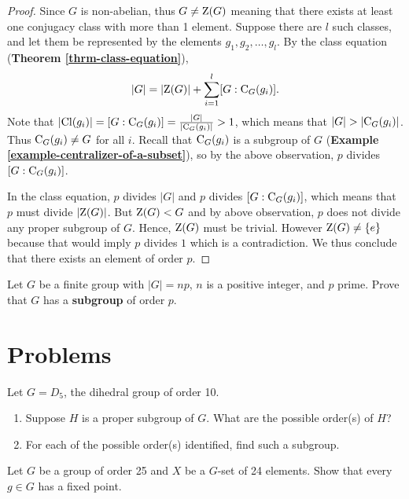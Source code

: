 \begin{proof}
    Since $G$ is non-abelian, thus $G \neq \mathrm{Z}(G)$ meaning that there exists at least one conjugacy class with more than 1 element. Suppose there are $l$ such classes, and let them be represented by the elements $g_1, g_2, \dots, g_l$. By the class equation (\textbf{Theorem \ref{thrm-class-equation}}),
    \[
        |G| = |\mathrm{Z}(G)| + \sum_{i=1}^l [G:\mathrm{C}_{G}(g_i)].
    \]
    Note that $|\mathrm{Cl}(g_i)| = [G:\mathrm{C}_{G}(g_i)] = \frac{|G|}{|\mathrm{C}_{G}(g_i)|} > 1$, which means that $|G| > |\mathrm{C}_{G}(g_i)|$. Thus $\mathrm{C}_{G}(g_i) \neq G$ for all $i$. Recall that $\mathrm{C}_{G}(g_i)$ is a subgroup of $G$ (\textbf{Example \ref{example-centralizer-of-a-subset}}), so by the above observation, $p$ divides $[G:\mathrm{C}_{G}(g_i)]$.

    In the class equation, $p$ divides $|G|$ and $p$ divides $[G:\mathrm{C}_{G}(g_i)]$, which means that $p$ must divide $|\mathrm{Z}(G)|$. But $\mathrm{Z}(G) < G$ and by above observation, $p$ does not divide any proper subgroup of $G$. Hence, $\mathrm{Z}(G)$ must be trivial. However $\mathrm{Z}(G) \neq \{e\}$ because that would imply $p$ divides $1$ which is a contradiction. We thus conclude that there exists an element of order $p$.
\end{proof}

\begin{exercise}\label{exercise-group-of-order-multiple-of-prime-has-subgroup-of-prime-order}
    Let $G$ be a finite group with $|G| = np$, $n$ is a positive integer, and $p$ prime. Prove that $G$ has a \textbf{subgroup} of order $p$.
\end{exercise}

\newpage

\section{Problems}
\begin{problem}
    Let $G = D_5$, the dihedral group of order 10.
    \begin{enumerate}[label=(\alph*)]
        \item Suppose $H$ is a proper subgroup of $G$. What are the possible order(s) of $H$?
        \item For each of the possible order(s) identified, find such a subgroup.
    \end{enumerate}
\end{problem}

\begin{problem}
    Let $G$ be a group of order 25 and $X$ be a $G$-set of 24 elements. Show that every $g \in G$ has a fixed point.
\end{problem}

